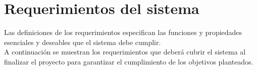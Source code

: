 \section{Requerimientos del sistema}
Las definiciones de los requerimientos especifican las funciones y propiedades esenciales y deseables que el sistema debe cumplir.\\

A continuación se muestran los requerimientos que deberá cubrir el sistema al finalizar el proyecto para garantizar el cumplimiento de los objetivos planteados.
\begin{ReqSist}
%	
%    
%	
%	
%    
	
\end{ReqSist}